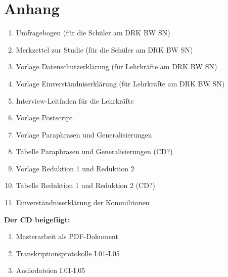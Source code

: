 \section{Anhang}
\label{sec:Anhang}

\begin{enumerate}
	\item Umfragebogen (für die Schüler am DRK BW SN)
	\item Merkzettel zur Studie (für die Schüler am DRK BW SN)
	\item Vorlage Datenschutzerklärung (für Lehrkräfte am DRK BW SN)
	\item Vorlage Einverständniserklärung (für Lehrkräfte am DRK BW SN)
	\item Interview-Leitfaden für die Lehrkräfte
	\item Vorlage Postscript
	\item Vorlage Paraphrasen und Generalisierungen
	\item Tabelle Paraphrasen und Generalisierungen (CD?)
	\item Vorlage Reduktion 1 und Reduktion 2
	\item Tabelle Reduktion 1 und Reduktion 2 (CD?)
	\item Einverständniserklärung der Kommilitonen\\[1.5cm]
\end{enumerate}


\textbf{Der CD beigefügt:}
\begin{enumerate}
	\item Masterarbeit als PDF-Dokument
	\item Transkriptionsprotokolle I.01-I.05
	\item Audiodateien I.01-I.05
\end{enumerate}











\listoffigures
